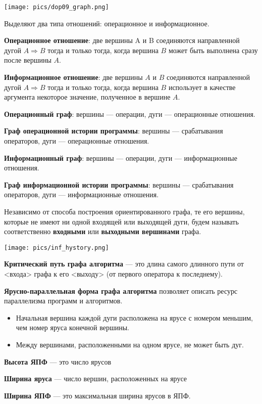 \texttt{[image: pics/dop09\_graph.png]}

Выделяют два типа отношений: операционное и информационное.

\textbf{Операционное отношение}: две вершины A и B соединяются направленной дугой $A \Rightarrow B$ тогда и только тогда, когда вершина $B$ может быть выполнена сразу после вершины $A$.

\textbf{Информационное отношение}: две вершины $A$ и $B$ соединяются направленной дугой $A \Rightarrow B$ тогда и только тогда, когда вершина $B$ использует в качестве аргумента некоторое значение, полученное в вершине $A$.

\bigbreak
\textbf{Операционный граф}: вершины --- операции, дуги --- операционные отношения.

\textbf{Граф операционной истории программы}: вершины --- срабатывания операторов, дуги --- операционные отношения.

\textbf{Информационный граф}: вершины --- операции, дуги --- информационные отношения.

\textbf{Граф информационной истории программы}: вершины --- срабатывания операторов, дуги --- информационные отношения. 

Независимо от способа построения ориентированного графа, те его вершины, которые не имеют ни одной входящей или выходящей дуги, будем называть соответственно \textbf{входными} или \textbf{выходными вершинами} графа.


\texttt{[image: pics/inf\_hystory.png]}

\textbf{Критический путь графа алгоритма} --- это длина самого длинного пути от <входа> графа к его <выходу> (от первого оператора к последнему).

\textbf{Ярусно-параллельная форма графа алгоритма} позволяет описать ресурс параллелизма программ и алгоритмов.
\begin{itemize}
    \item Начальная вершина каждой дуги расположена на ярусе с номером меньшим, чем номер яруса конечной вершины.
    \item Между вершинами, расположенными на одном ярусе, не может быть дуг.
\end{itemize}

\textbf{Высота ЯПФ} --- это число ярусов 

\textbf{Ширина яруса} --- число вершин, расположенных на ярусе

\textbf{Ширина ЯПФ} --- это максимальная ширина ярусов в ЯПФ.

